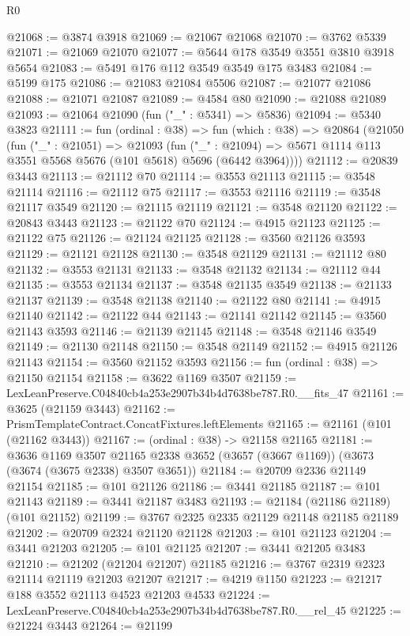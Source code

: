 \begin{lexlean}{R0}
\begin{coremodule}
@21068 := @3874 @3918
@21069 := @21067 @21068
@21070 := @3762 @5339
@21071 := @21069 @21070
@21077 := @5644 @178 @3549 @3551 @3810 @3918 @5654
@21083 := @5491 @176 @112 @3549 @3549 @175 @3483
@21084 := @5199 @175
@21086 := @21083 @21084 @5506
@21087 := @21077 @21086
@21088 := @21071 @21087
@21089 := @4584 @80
@21090 := @21088 @21089
@21093 := @21064 @21090 (fun ("_" : @5341) => @5836)
@21094 := @5340 @3823
@21111 := fun (ordinal : @38) =>
  fun (which : @38) =>
  @20864
    (@21050
      (fun ("_" : @21051) =>
      @21093
        (fun ("_" : @21094) =>
        @5671 @1114 @113 @3551 @5568 @5676 (@101 @5618) @5696 (@6442 @3964))))
@21112 := @20839 @3443
@21113 := @21112 @70
@21114 := @3553 @21113
@21115 := @3548 @21114
@21116 := @21112 @75
@21117 := @3553 @21116
@21119 := @3548 @21117 @3549
@21120 := @21115 @21119
@21121 := @3548 @21120
@21122 := @20843 @3443
@21123 := @21122 @70
@21124 := @4915 @21123
@21125 := @21122 @75
@21126 := @21124 @21125
@21128 := @3560 @21126 @3593
@21129 := @21121 @21128
@21130 := @3548 @21129
@21131 := @21112 @80
@21132 := @3553 @21131
@21133 := @3548 @21132
@21134 := @21112 @44
@21135 := @3553 @21134
@21137 := @3548 @21135 @3549
@21138 := @21133 @21137
@21139 := @3548 @21138
@21140 := @21122 @80
@21141 := @4915 @21140
@21142 := @21122 @44
@21143 := @21141 @21142
@21145 := @3560 @21143 @3593
@21146 := @21139 @21145
@21148 := @3548 @21146 @3549
@21149 := @21130 @21148
@21150 := @3548 @21149
@21152 := @4915 @21126 @21143
@21154 := @3560 @21152 @3593
@21156 := fun (ordinal : @38) => @21150 @21154
@21158 := @3622 @1169 @3507
@21159 := LexLeanPreserve.C04840cb4a253e2907b34b4d7638be787.R0.__fits_47
@21161 := @3625 (@21159 @3443)
@21162 := PrismTemplateContract.ConcatFixtures.leftElements
@21165 := @21161 (@101 (@21162 @3443))
@21167 := (ordinal : @38) -> @21158 @21165
@21181 := @3636
    @1169
    @3507
    @21165
    @2338
    @3652
    (@3657 (@3667 @1169))
    (@3673 (@3674 (@3675 @2338) @3507 @3651))
@21184 := @20709 @2336 @21149 @21154
@21185 := @101 @21126
@21186 := @3441 @21185
@21187 := @101 @21143
@21189 := @3441 @21187 @3483
@21193 := @21184 (@21186 @21189) (@101 @21152)
@21199 := @3767 @2325 @2335 @21129 @21148 @21185 @21189
@21202 := @20709 @2324 @21120 @21128
@21203 := @101 @21123
@21204 := @3441 @21203
@21205 := @101 @21125
@21207 := @3441 @21205 @3483
@21210 := @21202 (@21204 @21207) @21185
@21216 := @3767 @2319 @2323 @21114 @21119 @21203 @21207
@21217 := @4219 @1150
@21223 := @21217 @188 @3552 @21113 @4523 @21203 @4533
@21224 := LexLeanPreserve.C04840cb4a253e2907b34b4d7638be787.R0.__rel_45
@21225 := @21224 @3443
@21264 := @21199

\end{coremodule}
\end{lexlean}
